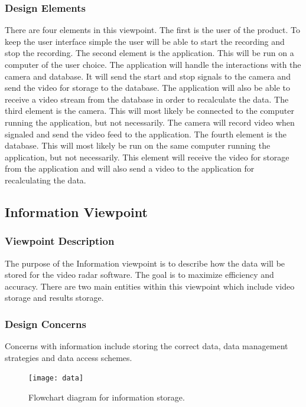 \documentclass[onecolumn, draftclsnofoot,10pt, compsoc]{IEEEtran}
\begin{document}
\subsubsection{Design Elements}

There are four elements in this viewpoint.
The first is the user of the product.
To keep the user interface simple the user will be able to start the recording and stop the recording.
The second element is the application.
This will be run on a computer of the user choice.
The application will handle the interactions with the camera and database.
It will send the start and stop signals to the camera and send the video for storage to the database.
The application will also be able to receive a video stream from the database in order to recalculate the data.
The third element is the camera.
This will most likely be connected to the computer running the application, but not necessarily. The camera will record video when signaled and send the video feed to the application.
The fourth element is the database.
This will most likely be run on the same computer running the application, but not necessarily.
This element will receive the video for storage from the application and will also send a video to the application for recalculating the data.

\subsection{Information Viewpoint}
\subsubsection{Viewpoint Description}
The purpose of the Information viewpoint is to describe how the data will be stored for the video radar software. The goal is to maximize efficiency and accuracy. There are two main entities within this viewpoint which include video storage and results storage.

\subsubsection{Design Concerns} 
Concerns with information include storing the correct data, data management strategies and data access schemes.

\begin{figure}[H]
\texttt{[image: data]}
\caption{Flowchart diagram for information storage.}
\label{fig:data}
\end{figure}
\end{document}
